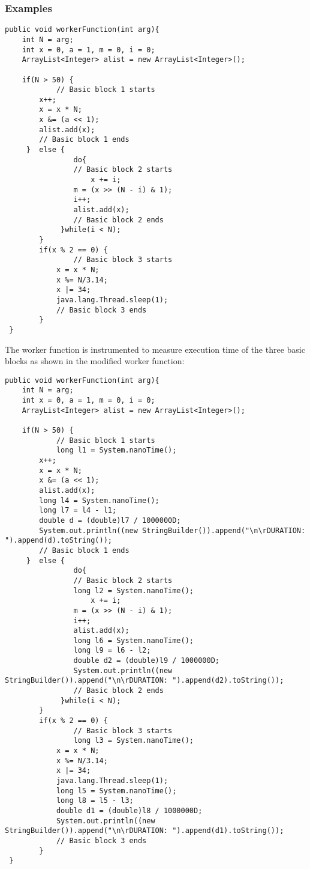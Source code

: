 \subsubsection{Examples}
\singlespacing
\begin{lstlisting}
public void workerFunction(int arg){
	int N = arg;
    int x = 0, a = 1, m = 0, i = 0;
    ArrayList<Integer> alist = new ArrayList<Integer>();

    if(N > 50) {
    		// Basic block 1 starts
        x++;
        x = x * N;
        x &= (a << 1);
        alist.add(x);
        // Basic block 1 ends
     }  else {
        		do{
               	// Basic block 2 starts
            		x += i;
                m = (x >> (N - i) & 1);
                i++;
                alist.add(x);
                // Basic block 2 ends
             }while(i < N);
        }
        if(x % 2 == 0) {
        		// Basic block 3 starts
            x = x * N;
            x %= N/3.14;
            x |= 34;
            java.lang.Thread.sleep(1);
            // Basic block 3 ends                   
        }
 }
\end{lstlisting}
\doublespacing

The worker function is instrumented to measure execution time of the three basic blocks as shown in the modified worker function:

\singlespacing
\begin{lstlisting}
public void workerFunction(int arg){
	int N = arg;
    int x = 0, a = 1, m = 0, i = 0;
    ArrayList<Integer> alist = new ArrayList<Integer>();

    if(N > 50) {
    		// Basic block 1 starts
    		long l1 = System.nanoTime();
        x++;
        x = x * N;
        x &= (a << 1);
        alist.add(x);
        long l4 = System.nanoTime();
        long l7 = l4 - l1;
        double d = (double)l7 / 1000000D;
        System.out.println((new StringBuilder()).append("\n\rDURATION: ").append(d).toString());
        // Basic block 1 ends
     }  else {
        		do{
               	// Basic block 2 starts
				long l2 = System.nanoTime();               	
            		x += i;
                m = (x >> (N - i) & 1);
                i++;
                alist.add(x);
                long l6 = System.nanoTime();
                long l9 = l6 - l2;
                double d2 = (double)l9 / 1000000D;
                System.out.println((new StringBuilder()).append("\n\rDURATION: ").append(d2).toString());
                // Basic block 2 ends
             }while(i < N);
        }
        if(x % 2 == 0) {
        		// Basic block 3 starts
        		long l3 = System.nanoTime();
            x = x * N;
            x %= N/3.14;
            x |= 34;
            java.lang.Thread.sleep(1);
            long l5 = System.nanoTime();
            long l8 = l5 - l3;
            double d1 = (double)l8 / 1000000D;
            System.out.println((new StringBuilder()).append("\n\rDURATION: ").append(d1).toString());
            // Basic block 3 ends                   
        }
 }
\end{lstlisting}
\doublespacing

